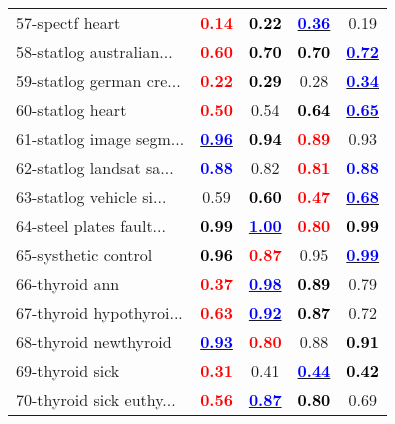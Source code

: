 \begin{table}
\begin{center}
\begin{tabular}{lc|c|c|c}
57-spectf heart & \textcolor{red}{\textbf{  0.14}} & \textcolor{black}{\textbf{  0.22}} & \underline{\textcolor{blue}{\textbf{  0.36}}} &   0.19 \\
58-statlog australian... & \textcolor{red}{\textbf{  0.60}} & \textcolor{black}{\textbf{  0.70}} & \textcolor{black}{\textbf{  0.70}} & \underline{\textcolor{blue}{\textbf{  0.72}}} \\
59-statlog german cre... & \textcolor{red}{\textbf{  0.22}} & \textcolor{black}{\textbf{  0.29}} &   0.28 & \underline{\textcolor{blue}{\textbf{  0.34}}} \\ \hline
60-statlog heart & \textcolor{red}{\textbf{  0.50}} &   0.54 & \textcolor{black}{\textbf{  0.64}} & \underline{\textcolor{blue}{\textbf{  0.65}}} \\
61-statlog image segm... & \underline{\textcolor{blue}{\textbf{  0.96}}} & \textcolor{black}{\textbf{  0.94}} & \textcolor{red}{\textbf{  0.89}} &   0.93 \\
62-statlog landsat sa... & \textcolor{blue}{\textbf{  0.88}} &   0.82 & \textcolor{red}{\textbf{  0.81}} & \textcolor{blue}{\textbf{  0.88}} \\
63-statlog vehicle si... &   0.59 & \textcolor{black}{\textbf{  0.60}} & \textcolor{red}{\textbf{  0.47}} & \underline{\textcolor{blue}{\textbf{  0.68}}} \\
64-steel plates fault... & \textcolor{black}{\textbf{  0.99}} & \underline{\textcolor{blue}{\textbf{  1.00}}} & \textcolor{red}{\textbf{  0.80}} & \textcolor{black}{\textbf{  0.99}} \\ \hline
65-systhetic control & \textcolor{black}{\textbf{  0.96}} & \textcolor{red}{\textbf{  0.87}} &   0.95 & \underline{\textcolor{blue}{\textbf{  0.99}}} \\
66-thyroid ann & \textcolor{red}{\textbf{  0.37}} & \underline{\textcolor{blue}{\textbf{  0.98}}} & \textcolor{black}{\textbf{  0.89}} &   0.79 \\
67-thyroid hypothyroi... & \textcolor{red}{\textbf{  0.63}} & \underline{\textcolor{blue}{\textbf{  0.92}}} & \textcolor{black}{\textbf{  0.87}} &   0.72 \\
68-thyroid newthyroid & \underline{\textcolor{blue}{\textbf{  0.93}}} & \textcolor{red}{\textbf{  0.80}} &   0.88 & \textcolor{black}{\textbf{  0.91}} \\
69-thyroid sick & \textcolor{red}{\textbf{  0.31}} &   0.41 & \underline{\textcolor{blue}{\textbf{  0.44}}} & \textcolor{black}{\textbf{  0.42}} \\ \hline
70-thyroid sick euthy... & \textcolor{red}{\textbf{  0.56}} & \underline{\textcolor{blue}{\textbf{  0.87}}} & \textcolor{black}{\textbf{  0.80}} &   0.69 \\

\end{tabular}
\end{center}
\end{table}
